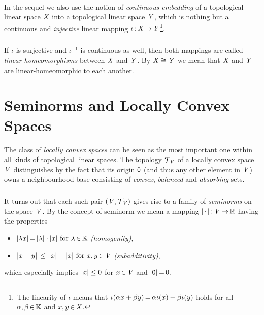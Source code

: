 \documentclass[11pt,twoside]{article}
\begin{document}
\paragraph{} %
In the sequel we also use the notion of \textit{continuous embedding}
of a topological linear space $\mathit{X}$ into a topological linear space $\mathit{Y}$,
which is nothing but a continuous and \textit{injective} linear mapping
$\iota{\,:\,}\mathit{X} {\,\to\,} \mathit{Y}$\footnote{
\,The linearity of $\iota$ means that
$\iota(\alpha x + \beta y) {\,=\,} \alpha \iota(x) + \beta \iota(y)$ holds
for all $\alpha, \beta {\,\in\,} {\mathbb{K}}$ and $x,y {\,\in\,} \mathit{X}$.}.

\subparagraph{} %
If $\iota$ is surjective and $\iota^{-1}$ is continuous as well,
then both mappings are called \textit{linear homeomorphisms}
between $\mathit{X}$ and $\mathit{Y}$.
By $\mathit{X} \cong \mathit{Y}$ we mean
that $\mathit{X}$ and $\mathit{Y}$ are linear-homeomorphic to each another.

\section{Seminorms and Locally Convex Spaces}
The class of \textit{locally convex spaces} can be seen as
the most important one within all kinds of topological linear spaces.
The topology $\mathcal{T}_{\,\mathit{V}}$ of a locally convex space $\mathit{V}$ distinguishes
by the fact
that its origin ${\mathsf{0}}$
(and thus any other element in $\mathit{V}$) owns a neighbourhood base
consisting of \textit{convex}, \textit{balanced} and \textit{absorbing} sets.

\subparagraph{} %
It turns out
that each such pair $(\mathit{V},\mathcal{T}_{\,\mathit{V}})$ gives rise
to a family of \textit{seminorms} on the space $\mathit{V}$.
By the concept of seminorm
we mean a mapping $\abs{\,\cdot\,} \:\vecV \xto \R$ having the properties

\begin{itemize}[leftmargin=55pt,itemsep=2pt]
\item[(SN-1)] \quad
$\abs{\lambda x} \eq \abs{\lambda} \cdot \abs{x} \for \lambda \xeof \F$
\textit{(homogenity)},

\item[(SN-2)] \quad
$\abs{x+y} \, \leq \, \abs{x} + \abs{x} \for x,y \xeof \vecV$
\textit{(subadditivity)},
\end{itemize}

which especially implies $\abs{x} \leq 0$ for $x {\,\in\,} \mathit{V}$
and $\abs{\0} \eq 0$.
\end{document}

